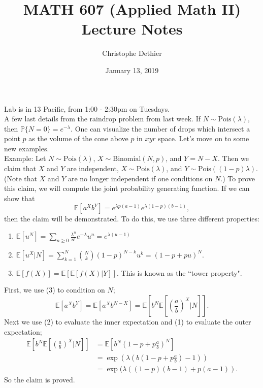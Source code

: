\documentclass[12pt]{article}
\title{MATH 607 (Applied Math II) Lecture Notes}
\author{Christophe Dethier}
\date{January 13, 2019}
\theoremstyle{plain}
\begin{document}
\bigskip
\maketitle

Lab is in 13 Pacific, from 1:00 - 2:30pm on Tuesdays.\\

A few last details from the raindrop problem from last week. If $N \sim \text{Pois}(\lambda)$, then $\mathbb{P}\{N = 0\} = e^{-\lambda}$. One can visualize the number of drops which intersect a point $p$ as the volume of the cone above $p$ in $xyr$ space. Let's move on to some new examples.\\

Example: Let $N \sim \text{Pois}(\lambda)$, $X \sim \text{Binomial}(N,p)$, and $Y = N - X$. Then we claim that $X$ and $Y$ are independent, $X \sim \text{Pois}(\lambda)$, and $Y \sim \text{Pois}((1 - p)\lambda)$. (Note that $X$ and $Y$ are no longer independent if one conditions on $N$.) To prove this claim, we will compute the joint probability generating function. If we can show that
\[
\mathbb{E}\left[ a^X b^Y\right] = e^{\lambda p(a - 1)} e^{\lambda(1 - p)(b - 1)},
\]
then the claim will be demonstrated. To do this, we use three different properties:
\begin{enumerate}[(1)]
\item $\displaystyle \mathbb{E}\left[ u^N\right] = \sum_{n \geq 0} \frac{\lambda^n}{n!} e^{-\lambda} u^n = e^{\lambda(u - 1)}$
\item $\displaystyle \mathbb{E}\left[ u^X | N\right] = \sum_{k=1}^N {N \choose k} (1 - p)^{N - k} u^k = (1 - p + pu)^N$.
\item $\displaystyle \mathbb{E}\left[ f(X) \right] = \mathbb{E}\left[ \mathbb{E}\left[ f(X) | Y\right] \right]$. This is known as the ``tower property".
\end{enumerate}
First, we use (3) to condition on $N$;
\[
\mathbb{E}\left[ a^X b^Y\right] = \mathbb{E}\left[ a^X b^{N-X}\right] = \mathbb{E}\left[b^N \mathbb{E}\left[ \left( \frac{a}{b} \right)^X | N\right] \right].
\]
Next we use (2) to evaluate the inner expectation and (1) to evaluate the outer expectation;
\begin{align*}
\mathbb{E}\left[b^N \mathbb{E}\left[ \left( \frac{a}{b} \right)^X | N\right] \right] &= \mathbb{E}\left[ b^N\left(1 - p + p \frac{a}{b}\right)^N \right] \\
&= \exp\left(\lambda \left(b \left( 1 - p + p \frac{a}{b} \right) - 1 \right) \right) \\
&= \exp(\lambda((1 - p)(b - 1) + p ( a -1 )).
\end{align*}
So the claim is proved. \\
\end{document}

